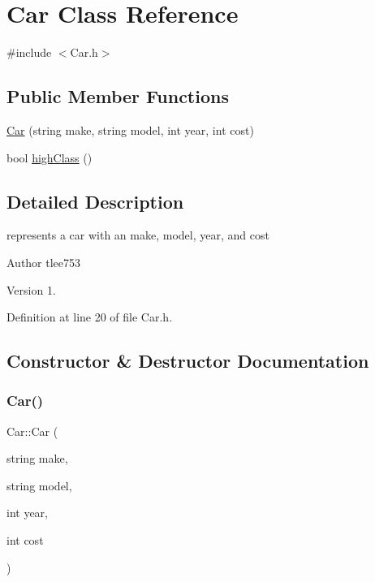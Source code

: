 \hypertarget{class_car}{}\section{Car Class Reference}
\label{class_car}


{\ttfamily \#include $<$Car.\+h$>$}

\subsection*{Public Member Functions}
\begin{DoxyCompactItemize}
\item 
\hyperlink{class_car_a9842a8a734dce534d3be923224cd6b03}{Car} (string make, string model, int year, int cost)
\item 
bool \hyperlink{class_car_ae7eb35511bf597b017bfbaaa6f91ff79}{high\+Class} ()
\end{DoxyCompactItemize}


\subsection{Detailed Description}
represents a car with an make, model, year, and cost

\begin{DoxyAuthor}{Author}
tlee753 
\end{DoxyAuthor}
\begin{DoxyVersion}{Version}
1. 
\end{DoxyVersion}


Definition at line 20 of file Car.\+h.



\subsection{Constructor \& Destructor Documentation}
\mbox{\label{class_car_a9842a8a734dce534d3be923224cd6b03}} 
\subsubsection{\texorpdfstring{Car()}{Car()}}
{\footnotesize\ttfamily Car\+::\+Car (\begin{DoxyParamCaption}\item[{string}]{make,  }\item[{string}]{model,  }\item[{int}]{year,  }\item[{int}]{cost }\end{DoxyParamCaption})}

